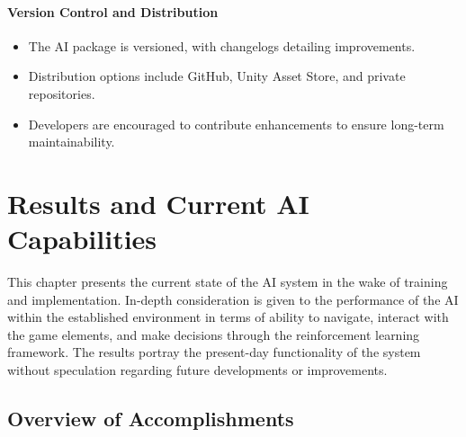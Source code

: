 \documentclass[12pt,oneside,openright,a4paper]{cpe-english-project}
\begin{document}
\subsubsection{Version Control and Distribution}
\begin{itemize}
\item  The AI package is versioned, with changelogs detailing improvements.
\item  Distribution options include GitHub, Unity Asset Store, and private repositories.
\item  Developers are encouraged to contribute enhancements to ensure long-term maintainability.
\end{itemize}
\chapter{Results and Current AI Capabilities}
This chapter presents the current state of the AI system in the wake of training and implementation. In-depth consideration is given to the performance of the AI within the established environment in terms of ability to navigate, interact with the game elements, and make decisions through the reinforcement learning framework. The results portray the present-day functionality of the system without speculation regarding future developments or improvements.
\section{Overview of Accomplishments}
\end{document}

